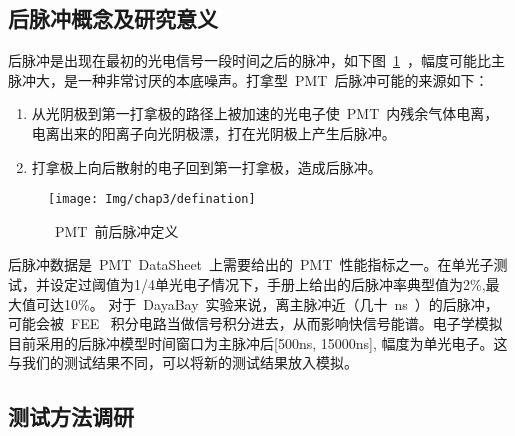 \subsection{后脉冲概念及研究意义}
后脉冲是出现在最初的光电信号一段时间之后的脉冲\citep{morton1967afterpulses}，如下图~\ref{fig:defination}~，幅度可能比主脉冲大，是一种非常讨厌的本底噪声。打拿型~PMT~后脉冲可能的来源如下\citep{akchurin2007study}：
\begin{enumerate}
\item 从光阴极到第一打拿极的路径上被加速的光电子使~PMT~内残余气体电离，电离出来的阳离子向光阴极漂，打在光阴极上产生后脉冲。
\item 打拿极上向后散射的电子回到第一打拿极，造成后脉冲。
\end{enumerate}
\begin{figure}[!htb]
  \centering
  \texttt{[image: Img/chap3/defination]}
  \caption{~PMT~前后脉冲定义}
  \label{fig:defination}
\end{figure}
后脉冲数据是~PMT~DataSheet~上需要给出的~PMT~性能指标之一。在单光子测试，并设定过阈值为1/4单光电子情况下，手册上给出的后脉冲率典型值为2\%,最大值可达10\%。 对于~DayaBay~实验来说，离主脉冲近（几十~ns~）的后脉冲，可能会被~FEE~ 积分电路当做信号积分进去，从而影响快信号能谱。电子学模拟目前采用的后脉冲模型时间窗口为主脉冲后[500ns, 15000ns], 幅度为单光电子。这与我们的测试结果不同，可以将新的测试结果放入模拟。
\subsection{测试方法调研}
